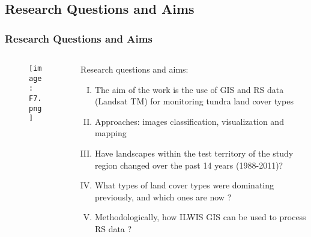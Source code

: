 \documentclass[pdflatex,compress,9pt,
	xcolor={dvipsnames,dvipsnames,svgnames,x11names,table},
	hyperref={colorlinks = true,breaklinks = true, urlcolor = NavyBlue, breaklinks = true}]{beamer}
\begin{document}
\subsection{Research Questions and Aims} 
\begin{frame}\frametitle{Research Questions and Aims}
\begin{minipage}[0.4\textheight]{\textwidth}
\begin{columns}[T]
\begin{column}{0.5\textwidth}
\vspace{2em}
\begin{figure}[H]
	\centering
		\texttt{[image: F7.png]}
\end{figure}
\end{column}
\begin{column}{0.5\textwidth}
\vspace{2em}
Research questions and aims: 
\begin{enumerate}[(I)]
            \item The aim of the work is the use of GIS and RS data (Landsat TM) for monitoring tundra land cover types
            \item Approaches: images classification, visualization and mapping
            \item Have landscapes within the test territory of the study region changed over the past 14 years (1988-2011)?
            \item What types of land cover types were dominating previously, and which ones are now ?
            \item Methodologically, how ILWIS GIS can be used to process RS data ?
\end{enumerate}
\end{column}
\end{columns}
\end{minipage}
\end{frame}
\end{document}
